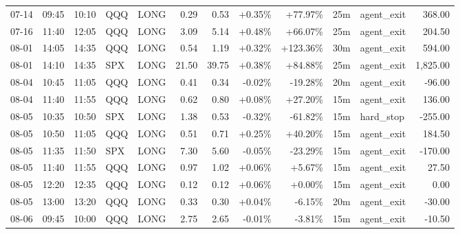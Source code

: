 \documentclass[11pt,a4paper]{article}
\begin{document}
\begin{center}
\begin{longtable}{>{\color{txtmain}}l l l l l r r r r r >{\color{txtmain}}l r}
07-14 & 09:45 & 10:10 & QQQ & LONG & 0.29 & 0.53 & \textcolor{wingreen}{+0.35\%} & \textcolor{wingreen}{+77.97\%} & 25m & agent\_exit & \textcolor{wingreen}{368.00} \\
07-16 & 11:40 & 12:05 & QQQ & LONG & 3.09 & 5.14 & \textcolor{wingreen}{+0.48\%} & \textcolor{wingreen}{+66.07\%} & 25m & agent\_exit & \textcolor{wingreen}{204.50} \\
08-01 & 14:05 & 14:35 & QQQ & LONG & 0.54 & 1.19 & \textcolor{wingreen}{+0.32\%} & \textcolor{wingreen}{+123.36\%} & 30m & agent\_exit & \textcolor{wingreen}{594.00} \\
08-01 & 14:10 & 14:35 & SPX & LONG & 21.50 & 39.75 & \textcolor{wingreen}{+0.38\%} & \textcolor{wingreen}{+84.88\%} & 25m & agent\_exit & \textcolor{wingreen}{1,825.00} \\
08-04 & 10:45 & 11:05 & QQQ & LONG & 0.41 & 0.34 & \textcolor{lossred}{-0.02\%} & \textcolor{lossred}{-19.28\%} & 20m & agent\_exit & \textcolor{lossred}{-96.00} \\
08-04 & 11:40 & 11:55 & QQQ & LONG & 0.62 & 0.80 & \textcolor{wingreen}{+0.08\%} & \textcolor{wingreen}{+27.20\%} & 15m & agent\_exit & \textcolor{wingreen}{136.00} \\
08-05 & 10:35 & 10:50 & SPX & LONG & 1.38 & 0.53 & \textcolor{lossred}{-0.32\%} & \textcolor{lossred}{-61.82\%} & 15m & hard\_stop & \textcolor{lossred}{-255.00} \\
08-05 & 10:50 & 11:05 & QQQ & LONG & 0.51 & 0.71 & \textcolor{wingreen}{+0.25\%} & \textcolor{wingreen}{+40.20\%} & 15m & agent\_exit & \textcolor{wingreen}{184.50} \\
08-05 & 11:35 & 11:50 & SPX & LONG & 7.30 & 5.60 & \textcolor{lossred}{-0.05\%} & \textcolor{lossred}{-23.29\%} & 15m & agent\_exit & \textcolor{lossred}{-170.00} \\
08-05 & 11:40 & 11:55 & QQQ & LONG & 0.97 & 1.02 & \textcolor{wingreen}{+0.06\%} & \textcolor{wingreen}{+5.67\%} & 15m & agent\_exit & \textcolor{wingreen}{27.50} \\
08-05 & 12:20 & 12:35 & QQQ & LONG & 0.12 & 0.12 & \textcolor{wingreen}{+0.06\%} & \textcolor{wingreen}{+0.00\%} & 15m & agent\_exit & \textcolor{wingreen}{0.00} \\
08-05 & 13:00 & 13:20 & QQQ & LONG & 0.33 & 0.30 & \textcolor{wingreen}{+0.04\%} & \textcolor{lossred}{-6.15\%} & 20m & agent\_exit & \textcolor{lossred}{-30.00} \\
08-06 & 09:45 & 10:00 & QQQ & LONG & 2.75 & 2.65 & \textcolor{lossred}{-0.01\%} & \textcolor{lossred}{-3.81\%} & 15m & agent\_exit & \textcolor{lossred}{-10.50} \\

\end{longtable}
\end{center}
\end{document}
